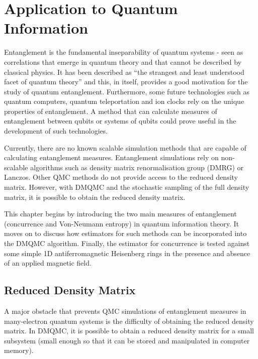 \chapter{Application to Quantum Information}
\label{ch:chapter3}
\ifpdf
    \graphicspath{{Chapter3/Chapter3Figs/PNG/}{Chapter3/Chapter3Figs/PDF/}{Chapter3/Chapter3Figs/}}
\else
    \graphicspath{{Chapter3/Chapter3Figs/EPS/}{Chapter3/Chapter3Figs/}}
\fi

Entanglement is the fundamental inseparability of quantum systems - seen as correlations that emerge in quantum theory and that cannot be described by classical physics. It has been described as ``the strangest and least understood facet of quantum theory''\cite{Rudolph} and this, in itself, provides a good motivation for the study of quantum entanglement. Furthermore, some future technologies such as quantum computers, quantum teleportation and ion clocks\cite{Rudolph} rely on the unique properties of entanglement. A method that can calculate measures of entanglement between qubits or systems of qubits could prove useful in the development of such technologies. 

Currently, there are no known scalable simulation methods\cite{Hastings2010} that are capable of calculating entanglement measures. Entanglement simulations rely on non-scalable algorithms such as density matrix renormalisation group (DMRG) or Lanczos. Other QMC methods do not provide access to the reduced density matrix. However, with DMQMC and the stochastic sampling of the full density matrix, it is possible to obtain the reduced density matrix.

This chapter begins by introducing the two main measures of entanglement (concurrence and Von-Neumann entropy) in quantum information theory. It moves on to discuss how estimators for such methods can be incorporated into the DMQMC algorithm. Finally, the estimator for concurrence is tested against some simple 1D antiferromagnetic Heisenberg rings in the presence and absence of an applied magnetic field.

\section{Reduced Density Matrix}

A major obstacle that prevents QMC simulations of entanglement measures in many-electron quantum systems is the difficulty of obtaining the reduced density matrix. In DMQMC, it is possible to obtain a reduced density matrix for a small subsystem (small enough so that it can be stored and manipulated in computer memory).

